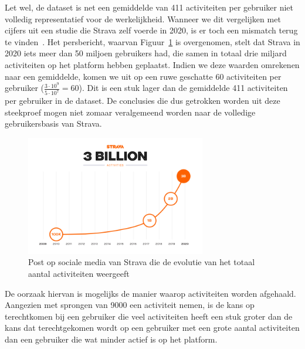 Let wel, de dataset is net een gemiddelde van 411 activiteiten per gebruiker
niet volledig representatief voor de werkelijkheid. Wanneer we dit vergelijken
met cijfers uit een studie die Strava zelf voerde in 2020, is er toch een
mismatch terug te vinden~\cite{StravaMi72:online}. Het persbericht, waarvan
Figuur~\ref{fig:3billionUsers} is overgenomen, stelt dat Strava in 2020 iets
meer dan 50 miljoen gebruikers had, die samen in totaal drie miljard
activiteiten op het platform hebben geplaatst. Indien we deze waarden omrekenen
naar een gemiddelde, komen we uit op een ruwe geschatte 60 activiteiten per
gebruiker ($\frac{3 \cdot 10^9}{5 \cdot 10^7} = 60 $). Dit is een stuk lager
dan de gemiddelde 411 activiteiten per gebruiker in de dataset. De conclusies
die dus getrokken worden uit deze steekproef mogen niet zomaar veralgemeend
worden naar de volledige gebruikersbasis van Strava.
\begin{figure}[h]
    \centering
    \includegraphics[width=0.7\textwidth]{fig/Strava_3billion.png}
    \caption{Post op sociale media van Strava die de evolutie van het totaal aantal activiteiten weergeeft~\cite{StravaMi72:online}}\label{fig:3billionUsers}
\end{figure}

De oorzaak hiervan is mogelijks de manier waarop activiteiten worden afgehaald.
Aangezien \citeauthor{Dhondt} met sprongen van 9000 een activiteit nemen, is de
kans op terechtkomen bij een gebruiker die veel activiteiten heeft een stuk
groter dan de kans dat terechtgekomen wordt op een gebruiker met een grote
aantal activiteiten dan een gebruiker die wat minder actief is op het platform.

